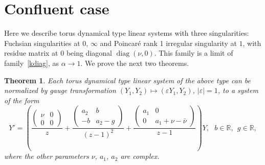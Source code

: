 \documentclass[preprint,12pt]{elsarticle}
\theoremstyle{plain}
\newtheorem{theorem}{Theorem}
\DeclareMathOperator{\diag}{\mathrm{diag}}
\def\a{\alpha}
\numberwithin{equation}{section}
\numberwithin{equation}{section}
\begin{document}
\section{Confluent case}\label{sec:confluent-case}

Here we describe torus dynamical type linear systems with three singularities: Fuchsian singularities at 
$0$, $\infty$ and Poincar\'e rank 1 irregular singularity at $1$, 
with residue matrix at $0$ being diagonal $\diag(\nu,0)$. This family is a limit of family~\eqref{kdiag}, as $\a\to1$. We prove the next two theorems.

\begin{theorem} \label{tconfs} Each torus dynamical type linear system of the above type  can be 
normalized by gauge transformation $(Y_1,Y_2)\mapsto(\varepsilon Y_1,Y_2)$, $|\varepsilon|=1$, to a system of 
the form 
\begin{equation} Y'=\left(\frac{\left(\begin{matrix}\nu & 0\\ 0 & 0\end{matrix}\right)}z+
\frac{\left(\begin{matrix}a_2 & b\\ - b & a_2-g\end{matrix}\right)}{(z-1)^2}  + \frac{\left(\begin{matrix} 
a_1 & 0\\ 0 & a_1+\nu-\bar\nu\end{matrix}\right)}{z-1}\right)Y, \ \ \ b\in\mathbb{R}, \ \ g\in\mathbb{R},\label{y'c}\end{equation}
where the other parameters $\nu$, $a_1$, $a_2$ are complex.
\end{theorem}
\end{document}
